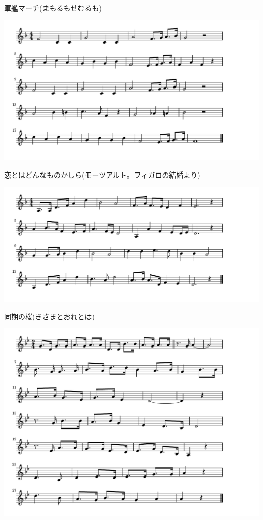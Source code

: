 \documentclass[a4paper]{ltjsarticle}
\begin{document}
\vspace{-10mm} \hspace{10mm}
軍艦マーチ(まもるもせむるも)

\includegraphics[clip]{koitowadonna_crop.pdf}

\vspace{-10mm} \hspace{10mm}
恋とはどんなものかしら(モーツアルト。フィガロの結婚より)

\includegraphics[clip]{doukinosakura_crop.pdf}

\vspace{-10mm} \hspace{10mm}
同期の桜(きさまとおれとは)

\includegraphics[clip]{tokyoondo_crop.pdf}
\end{document}
